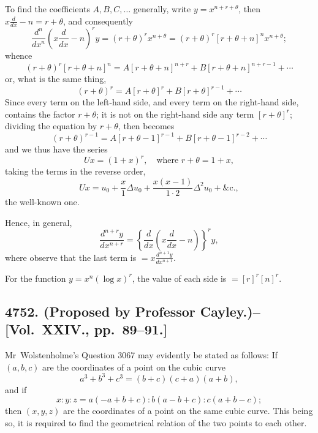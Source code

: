 \documentclass[11pt,a4paper]{book}
\begin{document}
\begin{solution}
To find the coefficients $A,B,C,\ldots$ generally, write $y=x^{n+r+\theta}$, then $x\frac{d}{dx} - n = r + \theta$, and consequently
\[
\frac{d^n}{dx^n}(x\frac{d}{dx} - n)^r y = (r+\theta)^r x^{n+\theta} = (r+\theta)^r[r+\theta+n]^n x^{n+\theta};
\]
whence
\[
(r+\theta)^r[r+\theta+n]^n = A[r+\theta+n]^{n+r} + B[r+\theta+n]^{n+r-1} + \cdots
\]
or, what is the same thing,
\[
(r+\theta)^r = A[r+\theta]^r + B[r+\theta]^{r-1} + \cdots
\]
Since every term on the left-hand side, and every term on the right-hand side, contains the factor $r+\theta$; it is not on the right-hand side any term $[r+\theta]^r$; dividing the equation by $r+\theta$, then becomes
\[
(r+\theta)^{r-1} = A[r+\theta-1]^{r-1} + B[r+\theta-1]^{r-2} + \cdots
\]
and we thus have the series
\[
Ux = (1+x)^r, \quad\text{where } r+\theta = 1+x,
\]
taking the terms in the reverse order,
\[
Ux = u_0 + \frac{x}{1}\Delta u_0 + \frac{x(x-1)}{1\cdot 2}\Delta^2 u_0 + \&\text{c.},
\]
the well-known one.

Hence, in general,
\[
\frac{d^{n+r}y}{dx^{n+r}} = \left\{ \frac{d}{dx}\left(x\frac{d}{dx} - n\right) \right\}^r y,
\]
where observe that the last term is $= x\frac{d^{n+1}y}{dx^{n+1}}$.

For the function $y=x^n(\log x)^r$, the value of each side is $=[r]^r[n]^r$.
\end{solution}

\newpage

\subsection*{4752. (Proposed by Professor Cayley.)\---[Vol.~XXIV., pp.~89--91.]}

Mr~Wolstenholme's Question 3067 may evidently be stated as follows: If $(a,b,c)$ are the coordinates of a point on the cubic curve
\[
a^3 + b^3 + c^3 = (b+c)(c+a)(a+b),
\]
and if
\[
x : y : z = a(-a+b+c) : b(a-b+c) : c(a+b-c);
\]
then $(x,y,z)$ are the coordinates of a point on the same cubic curve. This being so, it is required to find the geometrical relation of the two points to each other.
\end{document}
